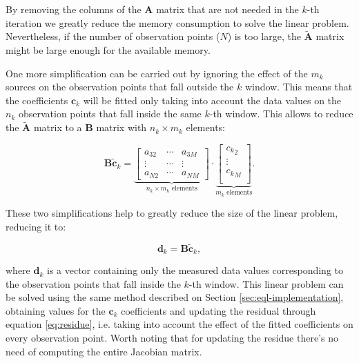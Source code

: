 \documentclass[twocolumn]{article}
\begin{document}
By removing the columns of the $\mathbf{A}$ matrix that are not needed in the
$k$-th iteration we greatly reduce the memory consumption to solve the linear
problem. Nevertheless, if the number of observation points ($N$) is too large,
the $\tilde{\mathbf{A}}$ matrix might be large enough for the available memory.

One more simplification can be carried out by ignoring the effect of the $m_k$
sources on the observation points that fall outside the $k$ window. This means
that the coefficients $\mathbf{c}_k$ will be fitted only taking into account
the data values on the $n_k$ observation points that fall inside the same
$k$-th window.
This allows to reduce the $\tilde{\mathbf{A}}$ matrix to a $\mathbf{B}$ matrix
with $n_k \times m_k$ elements:

\begin{equation}
    \mathbf{B} \tilde{\mathbf{c}}_k
    =
    \underbrace{
        \begin{bmatrix}
            a_{32} & \cdots & a_{3M} \\
            \vdots  & \cdots & \vdots \\
            a_{N2} & \cdots & a_{NM}
        \end{bmatrix}
    }_\text{$n_k \times m_k$ elements}
    \cdot
    \underbrace{
        \begin{bmatrix}
            {c_k}_2 \\
            \vdots  \\
            {c_k}_M \\
        \end{bmatrix}
    }_\text{$m_k$ elements}
    .
\end{equation}

These two simplifications help to greatly reduce the size of the linear
problem, reducing it to:

\begin{equation}
    \mathbf{d}_k = \mathbf{B} \tilde{\mathbf{c}}_k,
\end{equation}

\noindent where $\mathbf{d}_k$ is a vector containing only the measured data
values corresponding to the observation points that fall inside the $k$-th
window.
This linear problem can be solved using the same method described on Section
\ref{sec:eql-implementation}, obtaining values for the $\mathbf{c}_k$
coefficients and updating the residual through equation \ref{eq:residue}, i.e.
taking into account the effect of the fitted coefficients on every observation
point.
Worth noting that for updating the residue there's no need of computing the
entire Jacobian matrix.
\end{document}
